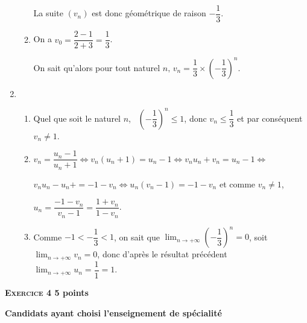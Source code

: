 \documentclass[10pt]{article}
\begin{document}
\begin{enumerate}
\begin{enumerate}
La suite $\left(v_{n}\right)$ est donc géométrique de raison $- \dfrac{1}{3}$.
		\item %
On a $v_{0} = \dfrac{2 - 1}{2 + 3} = \dfrac{1}{3}$.

On sait qu'alors pour tout naturel $n,\, v_{n} = \dfrac{1}{3}\times \left(- \dfrac{1}{3} \right)^n$.
	\end{enumerate} 
\item
	\begin{enumerate}
		\item %
		Quel que soit le naturel $n$, \, $\left(- \dfrac{1}{3} \right)^n \leqslant 1$, donc $v_{n} \leqslant \dfrac{1}{3}$ et par conséquent $v_{n}\neq 1$.  
		\item %
$v_{n} = \dfrac{u_{n} - 1}{u_{n} + 1} \iff v_{n}\left(u_{n} + 1 \right) = u_{n} - 1 \iff 
v_{n}u_{n} + v_{n} = u_{n} - 1 \iff$

$ v_{n}u_{n} - u_{n}+  =  - 1  - v_{n} \iff u_{n}\left(v_{n} - 1\right) = - 1  - v_{n}$ et comme $v_{n} \neq 1$, 

$u_{n} = \dfrac{- 1 - v_{n}}{v_{n} - 1} = \dfrac{1 + v_{n}}{1 - v_{n}}$.  
		\item %
Comme $- 1 < - \dfrac{1}{3} < 1$, on sait que $\displaystyle \lim_{n \to + \infty} \left(- \dfrac{1}{3} \right)^n = 0$, soit  $\displaystyle \lim_{n \to + \infty} v_{n} = 0$, donc d'après le résultat précédent $\displaystyle \lim_{n \to + \infty} u_{n} = \dfrac{1}{1} = 1$.
	\end{enumerate}
\end{enumerate}

\vspace{0,5cm}

\textbf{\textsc{Exercice 4} \hfill 5 points}

\textbf{Candidats ayant choisi l'enseignement de spécialité} 

\medskip
 
% 
%
% 
%
 
\end{document}
